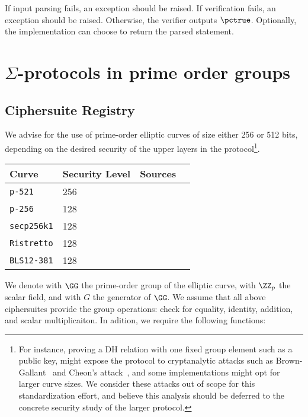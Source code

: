 \documentclass[runningheads,11pt]{article}
\begin{document}
If input parsing fails, an exception should be raised.
If verification fails, an exception should be raised.
Otherwise, the verifier outputs $\pctrue$. Optionally, the implementation can choose to return the parsed statement.





\section{$\Sigma$-protocols in prime order groups}
\label{sec:instantiation}



\subsection{Ciphersuite Registry}
 We advise for the use of prime-order elliptic curves of size either 256 or 512 bits, depending on the desired security of the upper layers in the protocol\footnote{For instance, proving a DH relation with one fixed group element such as a public key, might expose the protocol to cryptanalytic attacks such as Brown-Gallant~\cite{EPRINT:BroGal04} and Cheon’s attack~\cite{EC:Cheon06}, and some implementations might opt for larger curve sizes. We consider these attacks out of scope for this standardization effort, and believe this analysis should be deferred to the concrete security study of the larger protocol.}.

 \vspace{1em}
 \begin{center}
 \begin{tabular}{llcc}
  \hline
  Curve  & Security Level & Sources \\
  \hline
  \verb|p-521|     & 256& \cite{fips2} \\
  \verb|p-256|     & 128 & \cite{fips2}  \\
  \verb|secp256k1| & 128 & \cite{SECG} \\
  \verb|Ristretto| & 128 & \cite{cfrg-ristretto-decaf} \\
  \verb|BLS12-381| & 128 & \cite{bls12} \\
 \end{tabular}
\end{center}
We denote with $\GG$ the prime-order group of the elliptic curve, with $\ZZ_p$ the scalar field, and with $G$ the generator of $\GG$.
We assume that all above ciphersuites provide the group operations: check for equality, identity, addition, and scalar multiplicaiton. In adition, we require the following functions:
\end{document}
